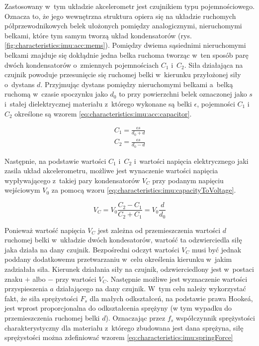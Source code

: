 																																											
Zastosowany w~tym układzie akcelerometr jest czujnikiem typu pojemnościowego. Oznacza to, że jego wewnętrzna struktura opiera się na układzie ruchomych półprzewodnikowych belek ułożonych pomiędzy analogicznymi, nieruchomymi belkami, które tym samym tworzą układ kondensatorów (rys. \ref{fig:characteristics:imu:acc:mems}). Pomiędzy dwiema sąsiednimi nieruchomymi belkami znajduje się dokłądnie jedna belka ruchoma tworząc w~ten sposób parę dwóch kondensatorów o~zmiennych pojemnościach $C_1$ i~$C_2$. Siła działająca na czujnik powoduje przesunięcie się ruchomej belki w~kierunku przyłożonej siły o~dystans $d$. Przyjmując dystans pomiędzy nieruchomymi belkami a~belką ruchomą w~czasie spoczynku jako $d_0$ to przy powierzchni belek oznaczonej jako $s$ i~stałej dielektrycznej materiału z~którego wykonane są belki $\epsilon$, pojemności $C_1$ i~$C_2$ określone są wzorem \ref{eq:characteristics:imu:acc:capacitor}.
																																												
\begin{subequations}
	\begin{align}
		C_1 = \frac{\epsilon s}{d_0 + d}             \\ 
		C_2 = \frac{\epsilon s}{d_0 - d}             
		\label{eq:characteristics:imu:acc:capacitor} 
	\end{align}
\end{subequations}
																																												
Następnie, na podstawie wartości $C_1$ i~$C_2$ i~wartości napięcia elektrycznego jaki zasila układ akcelerometru, możliwe jest wynaczenie wartości napięcia wypływającego z~takiej pary kondensatorów $V_C$ przy podanym napięciu wejściowym $V_0$ za pomocą wzoru \ref{eq:characteristics:imu:capacityToVoltage}.
																																											
\begin{equation}
	V_C = V_0 \frac{C_2-C_1}{C_2+C_1} = V_0\frac{d}{d_0}
	\label{eq:characteristics:imu:capacityToVoltage}
\end{equation}
																																												
Ponieważ wartość napięcia $V_C$ jest zależna od przemieszczenia wartości $d$ ruchomej belki w~układzie dwóch kondesatorów, wartość ta odzwierciedla siłę jaka działa na dany czujnik. Bezpośredni odczyt wartości $V_C$ musi być jednak poddany dodatkowemu przetwarzaniu w~celu określenia kierunku w~jakim zadziałała siła. Kierunek działania siły na czujnik, odzwierciedlony jest w~postaci znaku $+$ albo $-$ przy wartości $V_C$. Następnie możliwe jest wyznaczenie wartości przyspieszenia $a$ działającego na dany czujnik. W~tym celu należy wykorzystać fakt, że siła sprężystości $F_s$ dla małych odkształceń, na podstawie prawa Hooke\'a, jest wprost proporcjonalna do odkształcenia sprężyny (w tym wypadku do przemieszczenia ruchomej belki $d$). Oznaczając przez $f_s$ współczynnik sprężystości charakterystyczny dla materiału z~którego zbudowana jest dana sprężyna, siłę sprężystości można zdefiniować wzorem \ref{eq:characteristics:imu:springForce}
																																											

